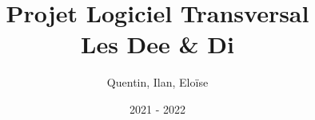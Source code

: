 \title{\large Projet Logiciel Transversal\\[0.5cm]
        \bf\Large Les Dee \& Di}
\author{\large {} Quentin,  Ilan,  Eloïse}
\date{2021 - 2022}
\makeatletter
    \begin{titlepage}
        \begin{center}
        \vbox{}\vspace{5cm}
            {\@title }\\[3cm] 
            {\@author}\\
            {\@date}
        \end{center}
    \end{titlepage}
\makeatother
